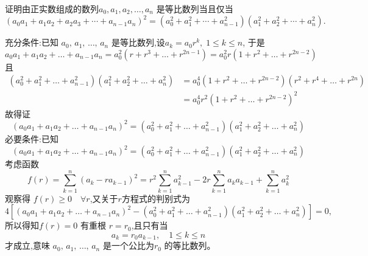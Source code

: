 \begin{questions}
    \question 证明由正实数组成的数列\(a_0, a_1, a_2, \ldots, a_n\) 是等比数列当且仅当
    \[
    \left(a_0 a_1 + a_1 a_2 + a_2 a_3 + \cdots + a_{n-1} a_n\right)^2 = \left(a_0^2 + a_1^2 + \cdots + a_{n-1}^2\right)\left(a_1^2 + a_2^2 + \cdots + a_n^2\right).
    \]
    \begin{solution}
        充分条件:已知 $a_0,\, a_1,\, \ldots,\, a_n$ 是等比数列,设$a_k = a_0 r^k,\; 1 \leq k \leq n$, 于是
        \[
        a_0 a_1 + a_1 a_2 + \ldots + a_{n-1} a_n 
        = a_0^2 (r + r^3 + \ldots + r^{2n-1}) = a_0^2 r \left(1 + r^2 + \ldots + r^{2n-2}\right)
        \]
        且
        \begin{align*}
        (a_0^2 + a_1^2 + \ldots + a_{n-1}^2)(a_1^2 + a_2^2 + \ldots + a_n^2)
        &= a_0^4 (1 + r^2 + \ldots + r^{2n-2})(r^2 + r^4 + \ldots + r^{2n}) \\
        &= a_0^4 r^2 \left(1 + r^2 + \ldots + r^{2n-2}\right)^2
        \end{align*}
        故得证
        \[
        (a_0 a_1 + a_1 a_2 + \ldots + a_{n-1} a_n)^2 = (a_0^2 + a_1^2 + \ldots + a_{n-1}^2)(a_1^2 + a_2^2 + \ldots + a_n^2)
        \]
        必要条件:已知
        \[
        (a_0 a_1 + a_1 a_2 + \ldots + a_{n-1} a_n)^2 = (a_0^2 + a_1^2 + \ldots + a_{n-1}^2)(a_1^2 + a_2^2 + \ldots + a_n^2)
        \]
        考虑函数
        \[
        f(r) = \sum_{k=1}^n (a_k - r a_{k-1})^2 = r^2 \sum_{k=1}^n a_{k-1}^2 - 2r \sum_{k=1}^n a_k a_{k-1} + \sum_{k=1}^n a_k^2
        \]
        观察得 $f(r) \geq 0 \quad \forall r$,又关于$r$方程式的判别式为
        \[
        4 \left[ (a_0 a_1 + a_1 a_2 + \ldots + a_{n-1} a_n)^2 - (a_0^2 + a_1^2 + \ldots + a_{n-1}^2)(a_1^2 + a_2^2 + \ldots + a_n^2) \right] = 0,
        \]
        所以得知$f(r) = 0$ 有重根 $r = r_0$,且只有当  
        \[
        a_k = r_0 a_{k-1},\quad 1 \leq k \leq n
        \]
        才成立,意味 $a_0,\, a_1,\, \ldots,\, a_n$ 是一个公比为$r_0$ 的等比数列。
    \end{solution}


\end{questions}

